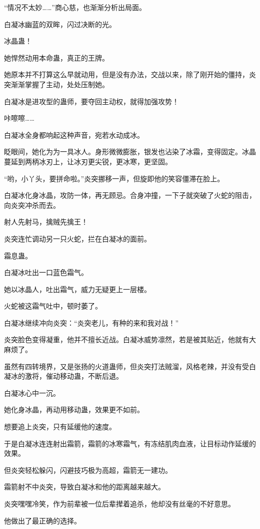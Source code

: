 \begin{this_body}
“情况不太妙……”商心慈，也渐渐分析出局面。

白凝冰幽蓝的双眸，闪过决断的光。

冰晶蛊！

她悍然动用本命蛊，真正的王牌。

她原本并不打算这么早就动用，但是没有办法，交战以来，除了刚开始的僵持，炎突渐渐掌握了主动，处处压制她。

白凝冰是进攻型的蛊师，要夺回主动权，就得加强攻势！

咔嚓嚓……

白凝冰全身都响起这种声音，宛若水动成冰。

眨眼间，她化为为一具冰人。身形微微膨胀，银发也沾染了冰霜，变得固定。冰晶蔓延到两柄冰刃上，让冰刃更尖锐，更冰寒，更坚固。

“哟，小丫头，要拼命啦。”炎突挪移一声，但旋即他的笑容僵滞在脸上。

白凝冰化身冰晶，攻防一体，再无顾忌。合身冲撞，一下子就突破了火蛇的阻击，向炎突冲杀而去。

射人先射马，擒贼先擒王！

炎突连忙调动另一只火蛇，拦在白凝冰的面前。

霜息蛊。

白凝冰吐出一口蓝色霜气。

她以冰晶人，吐出霜气，威力无疑更上一层楼。

火蛇被这霜气吐中，顿时萎了。

白凝冰继续冲向炎突：“炎突老儿，有种的来和我对战！”

炎突脸色变得凝重，他并不擅长近战。白凝冰威势凛然，若是被其贴近，他就有大麻烦了。

虽然有四转境界，又是张扬的火道蛊师，但炎突打法贼溜，风格老辣，并没有受白凝冰的激将，催动移动蛊，不断后退。

白凝冰心中一沉。

她化身冰晶，再动用移动蛊，效果更不如前。

想要追上炎突，只有延缓他的速度。

于是白凝冰连连射出霜箭，霜箭的冰寒霜气，有冻结肌肉血液，让目标动作延缓的效果。

但炎突轻松躲闪，闪避技巧极为高超，霜箭无一建功。

霜箭射不中炎突，导致白凝冰和他的距离越来越大。

炎突嘿嘿冷笑，作为前辈被一位后辈撵着追杀，他却没有丝毫的不好意思。

他做出了最正确的选择。


\end{this_body}
